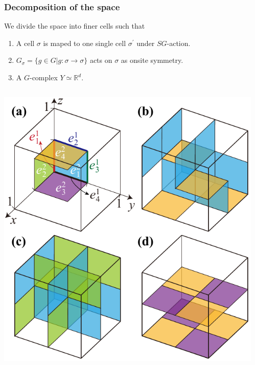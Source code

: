\documentclass[xcolor=table, aspectratio=43,ignorenonframetext]{beamer}
\begin{document}
\begin{frame}
	\frametitle{Decomposition of the space}
	We divide the space into finer cells such that
	\begin{enumerate}
		\item A cell $\sigma$ is maped to one single cell $\sigma^\prime$ under $SG$-action.
		\item $G_\sigma=\{g\in G|g:\sigma\rightarrow\sigma\}$ acts on $\sigma$ as onsite symmetry.
		\item A $G$-complex $Y\simeq \mathbb R^d$.
	\end{enumerate}
	\begin{columns}
		\begin{center}
			\includegraphics[width=.5\textwidth]{../spspt/blocks}
		\end{center}
		\begin{center}
		\end{center}
	\end{columns}
\end{frame}
\end{document}
